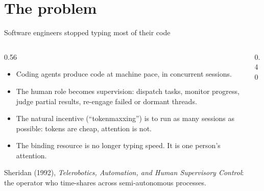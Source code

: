\documentclass[aspectratio=169,10pt]{beamer}
\newcommand{\good}[1]{\textcolor{Sage}{#1}}
\newcommand{\warnc}[1]{\textcolor{Amber}{#1}}
\newcommand{\src}[1]{{\scriptsize\color{InkFaint}#1\par}}
\begin{document}
\section{The problem}

\begin{frame}{Software engineers stopped typing most of their code}
  \begin{columns}[T]
    \begin{column}{0.56\textwidth}
      \begin{itemize}
        \item Coding agents produce code at machine pace, in
              \good{concurrent sessions}.
        \item The human role becomes \good{supervision}: dispatch tasks,
              monitor progress, judge partial results, re-engage failed or
              dormant threads.
        \item The natural incentive (\warnc{``tokenmaxxing''}) is to run as
              many sessions as possible: tokens are cheap, attention is not.
        \item The binding resource is no longer typing speed. It is
              \alert{one person's attention}.
      \end{itemize}
      \vfill
      \src{Sheridan (1992), \emph{Telerobotics, Automation, and Human
      Supervisory Control}: the operator who time-shares across
      semi-autonomous processes.}
    \end{column}
    \begin{column}{0.40\textwidth}
      \centering
\end{column}
\end{columns}
\end{frame}
\end{document}
